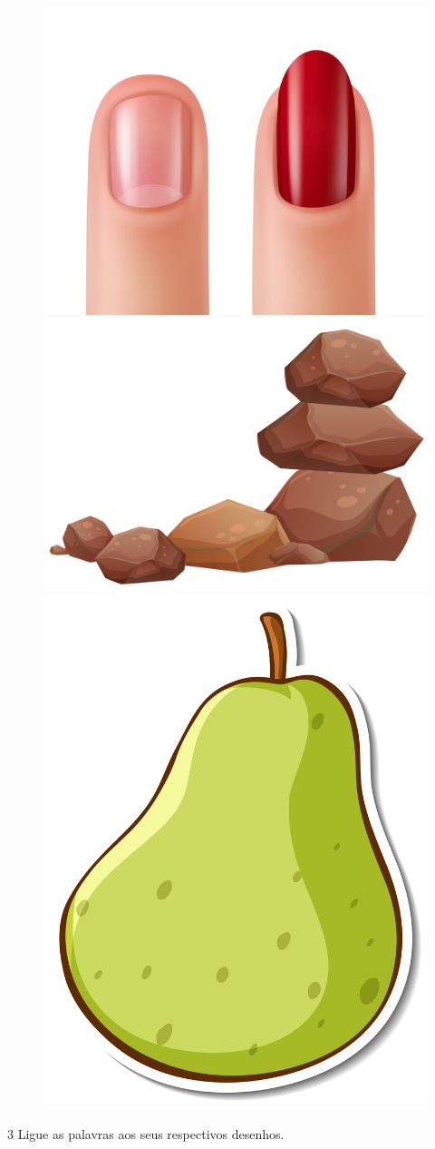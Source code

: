 

\vspace*{-1em}

\begin{figure}[H]
\centering
\includegraphics[width=.25\textwidth]{media/image55.jpeg}
\includegraphics[width=.25\textwidth]{media/image56.jpg}
\includegraphics[width=.2\textwidth]{media/image57.jpg}
\end{figure}




\num{3} Ligue as palavras aos seus respectivos desenhos.


